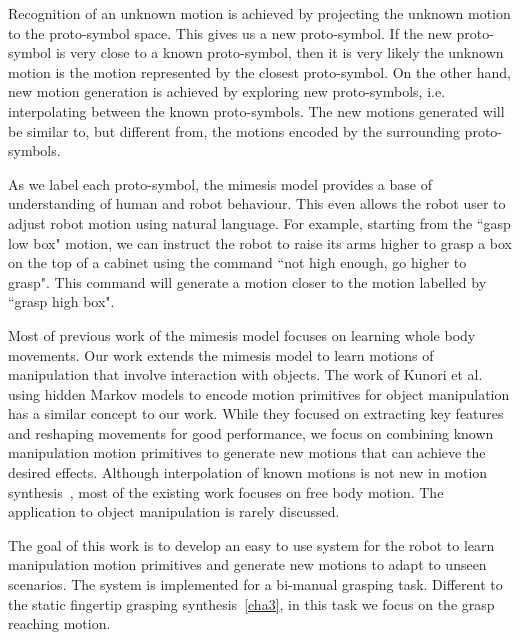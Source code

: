 Recognition of an unknown motion is achieved by projecting the unknown motion to the proto-symbol space. This gives us a new proto-symbol. If the new proto-symbol is very close to a known proto-symbol, then it is very likely the unknown motion is the motion represented by the closest proto-symbol. On the other hand, new motion generation is achieved by exploring new proto-symbols, i.e. interpolating between the known proto-symbols. The new motions generated will be similar to, but different from, the motions encoded by the surrounding proto-symbols.

As we label each proto-symbol, the mimesis model provides a base of understanding of human and robot behaviour. This even allows the robot user to adjust robot motion using natural language. For example, starting from the ``gasp low box" motion, we can instruct the robot to raise its arms higher to grasp a box on the top of a cabinet using the command ``not high enough, go higher to grasp". This command will generate a motion closer to the motion labelled by ``grasp high box".

Most of previous work of the mimesis model focuses on learning whole body movements. Our work extends the mimesis model to learn motions of manipulation that involve interaction with objects.
The work of Kunori et al.~\citep{kunori2009associating} using hidden Markov models to encode motion primitives for object manipulation has a similar concept to our work. While they focused on extracting key features and reshaping movements for good performance, we focus on combining known manipulation motion primitives to generate new motions that can achieve the desired effects. Although interpolation of known motions is not new in motion synthesis~\citep{hoshino2004interpolation,glardon2004pca}, most of the existing work focuses on free body motion. The application to object manipulation is rarely discussed.

The goal of this work is to develop an easy to use system for the robot to learn manipulation motion primitives and generate new motions to adapt to unseen scenarios. The system is implemented for a bi-manual grasping task. Different to the static fingertip grasping synthesis~\ref{cha3}, in this task we focus on the grasp reaching motion.




